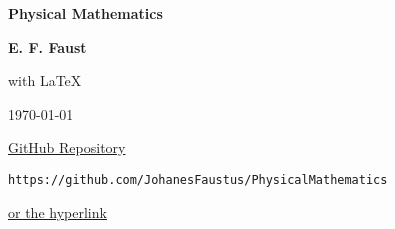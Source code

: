 \documentclass[../main.tex]{subfiles}
\begin{document}
\begin{center}

    \Huge
    \textbf{Physical Mathematics}

    \vspace{1.5cm}
    \Large
    \textbf{E. F. Faust}

    \vspace{0.2cm}
    \large with \LaTeX
    \vspace{\fill}
    \vspace{\fill}

    \Large
    {\today}

\end{center}

\clearpage

\vspace*{\fill}                      
\begin{center}

    \vspace{0.5cm}
    \Large\href{https://github.com/JohanesFaustus/PhysicalMathematics}{GitHub Repository}

    \vspace{0.2cm}

    \normalsize
    \texttt{https://github.com/JohanesFaustus/PhysicalMathematics}

    \href{https://github.com/JohanesFaustus/PhysicalMathematics}{or the hyperlink}
\end{center}
\vspace*{\fill}
\end{document}
